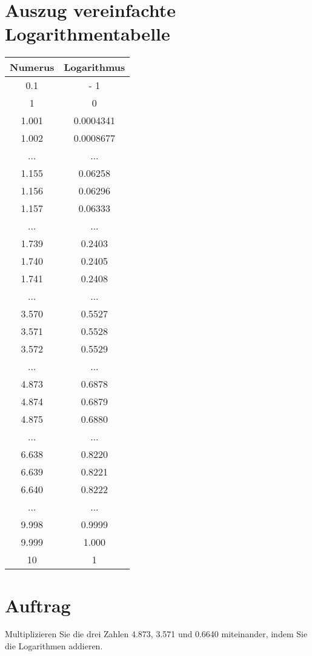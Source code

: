 




\renewcommand{\metaHeaderLine}{Logarithmen}
\renewcommand{\arbeitsblattTitel}{Multiplikation durch Addition}

\arbeitsblattHeader{}

\section*{Auszug vereinfachte Logarithmentabelle}

\begin{tabular}{|c|c|}\hline
Numerus & Logarithmus\\\hline
0.1   & - 1      \\\hline
1     & 0        \\\hline
1.001 & 0.0004341\\
1.002 & 0.0008677\\
...   & ...      \\
1.155 & 0.06258  \\
1.156 & 0.06296  \\
1.157 & 0.06333  \\
...   & ...      \\
1.739 & 0.2403   \\
1.740 & 0.2405   \\
1.741 & 0.2408   \\
...   & ...      \\
3.570 & 0.5527   \\
3.571 & 0.5528   \\
3.572 & 0.5529   \\
...   & ...      \\
4.873 & 0.6878   \\
4.874 & 0.6879   \\
4.875 & 0.6880   \\
...   & ...      \\
6.638 & 0.8220   \\
6.639 & 0.8221   \\
6.640 & 0.8222   \\
...   & ...      \\
9.998 & 0.9999   \\
9.999 & 1.000    \\\hline
10    & 1        \\\hline
\end{tabular}
 
\section*{Auftrag}
Multiplizieren Sie die drei Zahlen 4.873, 3.571 und 0.6640
miteinander, indem Sie die Logarithmen addieren.


